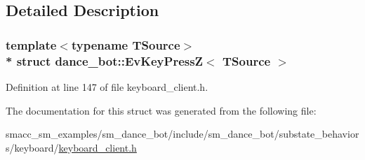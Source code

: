 \subsection{Detailed Description}
\subsubsection*{template$<$typename T\+Source$>$\\*
struct dance\+\_\+bot\+::\+Ev\+Key\+Press\+Z$<$ T\+Source $>$}



Definition at line 147 of file keyboard\+\_\+client.\+h.



The documentation for this struct was generated from the following file\+:\begin{DoxyCompactItemize}
\item 
smacc\+\_\+sm\+\_\+examples/sm\+\_\+dance\+\_\+bot/include/sm\+\_\+dance\+\_\+bot/substate\+\_\+behaviors/keyboard/\hyperlink{keyboard__client_8h}{keyboard\+\_\+client.\+h}\end{DoxyCompactItemize}
